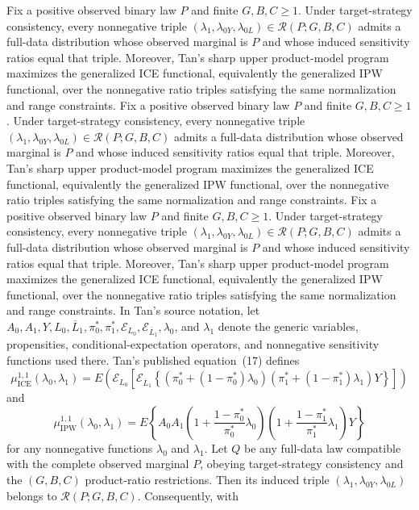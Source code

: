 Fix a positive observed binary law \(P\) and finite \(G,B,C\geq 1\). Under target-strategy consistency, every nonnegative triple \((\lambda_1,\lambda_{0Y},\lambda_{0L})\in\mathcal R(P;G,B,C)\) admits a full-data distribution whose observed marginal is \(P\) and whose induced sensitivity ratios equal that triple. Moreover, Tan's sharp upper product-model program maximizes the generalized ICE functional, equivalently the generalized IPW functional, over the nonnegative ratio triples satisfying the same normalization and range constraints.
Fix a positive observed binary law \(P\) and finite \(G,B,C\geq 1\). Under target-strategy consistency, every nonnegative triple \((\lambda_1,\lambda_{0Y},\lambda_{0L})\in\mathcal R(P;G,B,C)\) admits a full-data distribution whose observed marginal is \(P\) and whose induced sensitivity ratios equal that triple. Moreover, Tan's sharp upper product-model program maximizes the generalized ICE functional, equivalently the generalized IPW functional, over the nonnegative ratio triples satisfying the same normalization and range constraints.
Fix a positive observed binary law \(P\) and finite \(G,B,C\geq 1\). Under target-strategy consistency, every nonnegative triple \((\lambda_1,\lambda_{0Y},\lambda_{0L})\in\mathcal R(P;G,B,C)\) admits a full-data distribution whose observed marginal is \(P\) and whose induced sensitivity ratios equal that triple. Moreover, Tan's sharp upper product-model program maximizes the generalized ICE functional, equivalently the generalized IPW functional, over the nonnegative ratio triples satisfying the same normalization and range constraints.
In Tan's source notation, let \(A_0,A_1,Y,L_0,\overline L_1,\pi_0^*,\pi_1^*,\mathcal E_{L_0},\mathcal E_{\overline L_1},\lambda_0\), and \(\lambda_1\) denote the generic variables, propensities, conditional-expectation operators, and nonnegative sensitivity functions used there. Tan's published equation~(17) defines
\[
\mu^{1,1}_{\mathrm{ICE}}(\lambda_0,\lambda_1)
=E\!\left(\mathcal E_{L_0}\!\left[\mathcal E_{\overline L_1}\!\left\{(\pi_0^*+(1-\pi_0^*)\lambda_0)(\pi_1^*+(1-\pi_1^*)\lambda_1)Y\right\}\right]\right)
\]
and
\[
\mu^{1,1}_{\mathrm{IPW}}(\lambda_0,\lambda_1)
=E\!\left\{A_0A_1\left(1+\frac{1-\pi_0^*}{\pi_0^*}\lambda_0\right)\left(1+\frac{1-\pi_1^*}{\pi_1^*}\lambda_1\right)Y\right\}
\]
for any nonnegative functions \(\lambda_0\) and \(\lambda_1\).
Let \(Q\) be any full-data law compatible with the complete observed marginal \(P\), obeying target-strategy consistency and the \((G,B,C)\) product-ratio restrictions. Then its induced triple \((\lambda_1,\lambda_{0Y},\lambda_{0L})\) belongs to \(\mathcal R(P;G,B,C)\). Consequently, with
